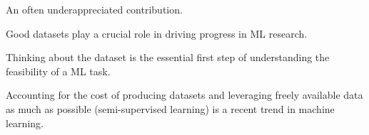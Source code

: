 \begin{concept}
    An often underappreciated contribution.

    Good datasets play a crucial role in driving progress in ML research.

    Thinking about the dataset is the essential first step of understanding the feasibility of a ML task.

    Accounting for the cost of producing datasets and leveraging freely available data as much as possible (semi-supervised learning) is a recent trend in machine learning.
\end{concept}
